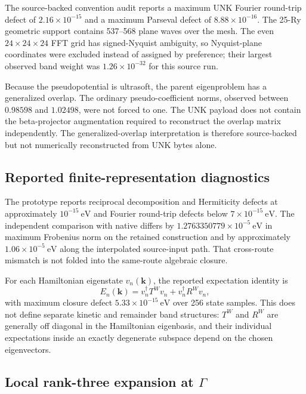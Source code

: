 The source-backed convention audit reports a maximum UNK Fourier round-trip
defect of $2.16\times10^{-15}$ and a maximum Parseval defect of
$8.88\times10^{-16}$. The 25-Ry geometric support contains 537--568 plane
waves over the mesh. The even $24\times24\times24$ FFT grid has signed-Nyquist
ambiguity, so Nyquist-plane coordinates were excluded instead of assigned by
preference; their largest observed band weight was
$1.26\times10^{-32}$ for this source run.

Because the pseudopotential is ultrasoft, the parent eigenproblem has a
generalized overlap. The ordinary pseudo-coefficient norms, observed between
$0.98598$ and $1.02498$, were not forced to one. The UNK payload does not
contain the beta-projector augmentation required to reconstruct the overlap
matrix independently. The generalized-overlap interpretation is therefore
source-backed but not numerically reconstructed from UNK bytes alone.

\subsection{Reported finite-representation diagnostics}

The prototype reports reciprocal decomposition and Hermiticity defects at
approximately $10^{-15}\ \mathrm{eV}$ and Fourier round-trip defects below
$7\times10^{-15}\ \mathrm{eV}$. The independent comparison with native
 differs by $1.2763350779\times10^{-5}\ \mathrm{eV}$ in maximum
Frobenius norm on the retained construction and by approximately
$1.06\times10^{-5}\ \mathrm{eV}$ along the interpolated source-input path.
That cross-route mismatch is not folded into the same-route algebraic closure.

For each Hamiltonian eigenstate $v_n(\mathbf k)$, the reported expectation
identity is
\begin{equation}
  E_n(\mathbf k)
  =v_n^\dagger T^Wv_n+v_n^\dagger R^Wv_n,
\end{equation}
with maximum closure defect $5.33\times10^{-15}\ \mathrm{eV}$ over 256
state samples. This does not define separate kinetic and remainder band
structures: $T^W$ and $R^W$ are generally off diagonal in the Hamiltonian
eigenbasis, and their individual expectations inside an exactly degenerate
subspace depend on the chosen eigenvectors.

\subsection{Local rank-three expansion at \texorpdfstring{$\Gamma$}{Gamma}}

